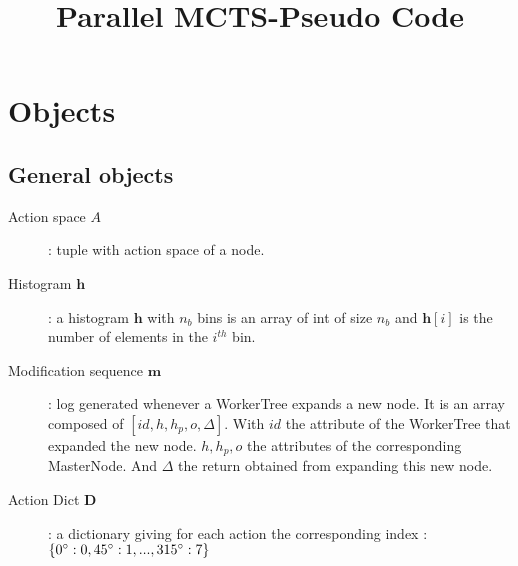 \documentclass[letterpaper]{article} %
\newcommand{\bsy}[1]{\boldsymbol{#1}}
\begin{document}
%
\title{Parallel MCTS-Pseudo Code}


% 
\author{ }

\maketitle

\section*{Objects}
\subsection*{General objects}
\begin{description}
\item[Action space $A$]: tuple with action space of a node. 

\item[Histogram $\bsy{h}$]: a histogram $\bsy{h}$ with $n_b$ bins is an array of int of size $n_b$ and $\bsy{h}[i]$ is the number of elements in the $i^{th}$ bin. 

\item[Modification sequence $\bsy{m}$]: log generated whenever a WorkerTree expands a new node. It is an array composed of $[id,h,h_p,o,\Delta]$. With $id$ the attribute of the WorkerTree that expanded the new node. $h,h_p,o$ the attributes of the corresponding MasterNode. And $\Delta$ the return obtained from expanding this new node.

\item[Action Dict $\bsy{D}$]: a dictionary giving for each action the corresponding index : $\{0\degree : 0, 45\degree:1,...,315\degree : 7\}$
\end{description}
\end{document}
